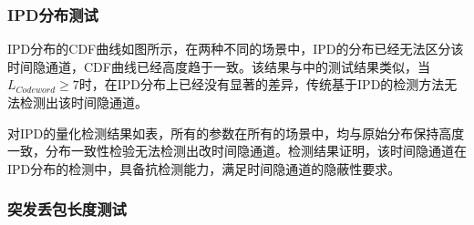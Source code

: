 \subsubsection{IPD分布测试}
\label{chap:zigzag:results:undetectability:ipd}


IPD分布的CDF曲线如图所示，在两种不同的场景中，IPD的分布已经无法区分该时间隐通道，CDF曲线已经高度趋于一致。该结果与中的测试结果类似，当$L_{Codeword}\ge 7$时，在IPD分布上已经没有显著的差异，传统基于IPD的检测方法无法检测出该时间隐通道。

对IPD的量化检测结果如表，所有的参数在所有的场景中，均与原始分布保持高度一致，分布一致性检验无法检测出改时间隐通道。检测结果证明，该时间隐通道在IPD分布的检测中，具备抗检测能力，满足时间隐通道的隐蔽性要求。

\subsubsection{突发丢包长度测试}
\label{chap:zigzag:results:undetectability:burst}

